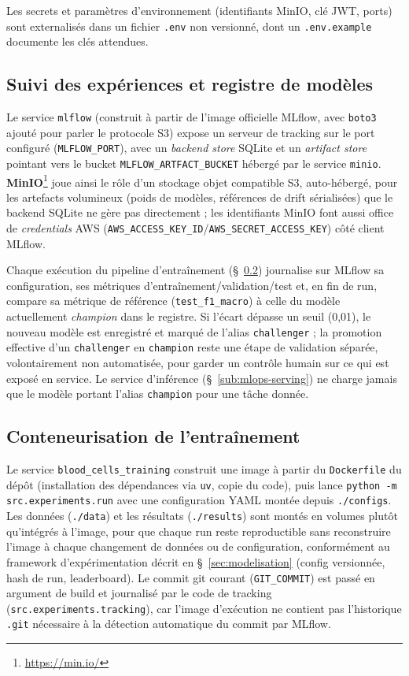 Les secrets et paramètres d'environnement (identifiants MinIO, clé JWT, ports) sont externalisés dans un fichier \texttt{.env} non versionné, dont un \texttt{.env.example} documente les clés attendues.

\subsection{Suivi des expériences et registre de modèles}
\label{sub:mlops-tracking}

Le service \texttt{mlflow} (construit à partir de l'image officielle MLflow, avec \texttt{boto3} ajouté pour parler le protocole S3) expose un serveur de tracking sur le port configuré (\texttt{MLFLOW\_PORT}), avec un \emph{backend store} SQLite et un \emph{artifact store} pointant vers le bucket \texttt{MLFLOW\_ARTFACT\_BUCKET} hébergé par le service \texttt{minio}.
\textbf{MinIO}\footnote{\url{https://min.io/}} joue ainsi le rôle d'un stockage objet compatible S3, auto-hébergé, pour les artefacts volumineux (poids de modèles, références de drift sérialisées) que le backend SQLite ne gère pas directement ; les identifiants MinIO font aussi office de \emph{credentials} AWS (\texttt{AWS\_ACCESS\_KEY\_ID}/\texttt{AWS\_SECRET\_ACCESS\_KEY}) côté client MLflow.

Chaque exécution du pipeline d'entraînement (\S~\ref{sub:mlops-training}) journalise sur MLflow sa configuration, ses métriques d'entraînement/validation/test et, en fin de run, compare sa métrique de référence (\texttt{test\_f1\_macro}) à celle du modèle actuellement \emph{champion} dans le registre.
Si l'écart dépasse un seuil (0,01), le nouveau modèle est enregistré et marqué de l'alias \texttt{challenger} ; la promotion effective d'un \texttt{challenger} en \texttt{champion} reste une étape de validation séparée, volontairement non automatisée, pour garder un contrôle humain sur ce qui est exposé en service.
Le service d'inférence (\S~\ref{sub:mlops-serving}) ne charge jamais que le modèle portant l'alias \texttt{champion} pour une tâche donnée.

\subsection{Conteneurisation de l'entraînement}
\label{sub:mlops-training}

Le service \texttt{blood\_cells\_training} construit une image à partir du \texttt{Dockerfile} du dépôt (installation des dépendances via \texttt{uv}, copie du code), puis lance \texttt{python -m src.experiments.run} avec une configuration YAML montée depuis \texttt{./configs}.
Les données (\texttt{./data}) et les résultats (\texttt{./results}) sont montés en volumes plutôt qu'intégrés à l'image, pour que chaque run reste reproductible sans reconstruire l'image à chaque changement de données ou de configuration, conformément au framework d'expérimentation décrit en \S~\ref{sec:modelisation} (config versionnée, hash de run, leaderboard).
Le commit git courant (\texttt{GIT\_COMMIT}) est passé en argument de build et journalisé par le code de tracking (\texttt{src.experiments.tracking}), car l'image d'exécution ne contient pas l'historique \texttt{.git} nécessaire à la détection automatique du commit par MLflow.

